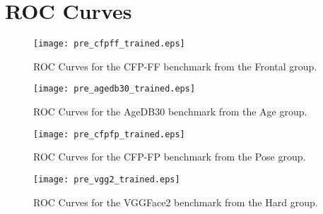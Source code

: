 \documentclass[class=report, crop=false, a4paper, 12pt]{standalone}
\begin{document}
\section*{ROC Curves}\label{sec:roc_curves_appendix}
\begin{figure}[H]
    \centering
    \begin{adjustbox}{center, minipage=1.2\textwidth, margin=0cm -0.1cm 0cm -0.1cm}  %
        \begin{minipage}[c]{0.49\textwidth}
            \centering
            \texttt{[image: pre\_cfpff\_trained.eps]}
            \caption{ROC Curves for the CFP-FF benchmark from the Frontal group.}
            \label{fig:roc_lfw}
        \end{minipage}
        \hfill
        \begin{minipage}[c]{0.49\textwidth}
            \centering
            \texttt{[image: pre\_agedb30\_trained.eps]}
            \caption{ROC Curves for the AgeDB30 benchmark from the Age group.}
            \label{fig:roc_calfw}
        \end{minipage}
    \end{adjustbox}
    \vspace{-0.4cm}
  \end{figure}
\vspace{-1cm}
\begin{figure}[H]
  \begin{adjustbox}{center, minipage=1.2\textwidth, margin=0cm -0.1cm 0cm -0.1cm}  %
      \begin{minipage}[c]{0.49\textwidth}
          \centering
          \texttt{[image: pre\_cfpfp\_trained.eps]}
          \caption{ROC Curves for the CFP-FP benchmark from the Pose group.}
          \label{fig:roc_cplfw}
      \end{minipage}
      \hfill
      \begin{minipage}[c]{0.49\textwidth}
          \centering
          \texttt{[image: pre\_vgg2\_trained.eps]}
          \caption{ROC Curves for the VGGFace2 benchmark from the Hard group.}
          \label{fig:roc_xqlfw}
      \end{minipage}
  \end{adjustbox}
  \vspace{-0.4cm}
\end{figure}
\end{document}
